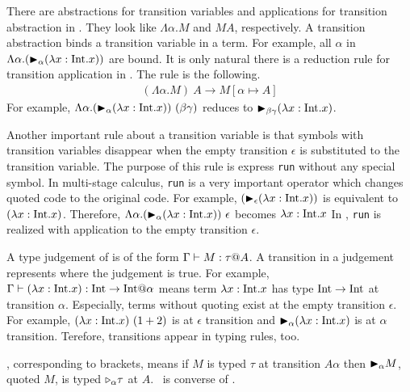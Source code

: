 There are abstractions for transition variables and applications for transition abstraction in \LTP.
They look like $\Lambda\alpha.M$ and $M A$, respectively.
A transition abstraction binds a transition variable in a term.
For example, all $\alpha$ in $\Lambda\alpha.({\mathop{\blacktriangleright}}_\alpha (\lambda x:\textrm{Int}.x))$ are bound.
It is only natural there is a reduction rule for transition application in \LTP.
The rule is the following.
\begin{align*}
	(\Lambda\alpha.M)\ A \longrightarrow M[\alpha\mapsto A]
\end{align*}
For example, $\Lambda\alpha.(\TB_\alpha (\lambda x:\I.x))\ (\beta\gamma)$ reduces to ${\mathop{\blacktriangleright}}_{\beta\gamma} (\lambda x:\textrm{Int}.x)$.


Another important rule about a transition variable is 
that symbols with transition variables disappear 
when the empty transition $\epsilon$ is substituted to the transition variable.
The purpose of this rule is express \verb|run| without any special symbol.
In multi-stage calculus, \verb|run| is a very important operator which changes quoted code to the original code.
For example, $({\mathop{\blacktriangleright}}_\epsilon (\lambda x:\textrm{Int}.x))$ is equivalent to $(\lambda x:\textrm{Int}.x)$.
Therefore, $\Lambda\alpha.({\mathop{\blacktriangleright}}_\alpha (\lambda x:\textrm{Int}.x))\ \epsilon$ becomes $\lambda x:\textrm{Int}.x$
In \LTP, \verb|run| is realized with application to the empty transition $\epsilon$.


A type judgement of \LTP is of the form $\Gamma \vdash M : \tau @ A$.
A transition in a judgement represents where the judgement is true.
For example, $\Gamma \vdash (\lambda x:\textrm{Int}.x) : \textrm{Int} \to \textrm{Int} @ \alpha$ means 
term $\lambda x:\textrm{Int}.x$ has type $\textrm{Int} \to \textrm{Int}$ at transition $\alpha$.
Especially, terms without quoting exist at the empty transition $\epsilon$.
For example, $(\lambda x:\textrm{Int}.x)\ (1+2)$ is at $\epsilon$ transition and 
${\mathop{\blacktriangleright}}_\alpha (\lambda x:\textrm{Int}.x)$ is at $\alpha$ transition.
Terefore, transitions appear in typing rules, too.
\begin{center}
	 \andalso
\end{center}
\TTB, corresponding to brackets, means 
if $M$ is typed $\tau$ at transition $A\alpha$ then ${\mathop{\blacktriangleright}}_{\alpha}M$, quoted $M$, is typed ${\mathop{\triangleright}}_{\alpha}\tau$ at $A$.
\TTBL\ is converse of \TTB.

